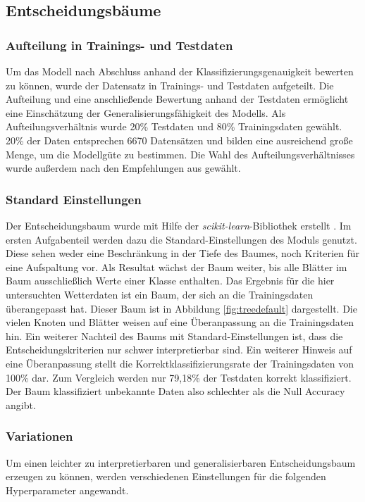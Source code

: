 \subsection{Entscheidungsbäume}
\label{section:Entscheidungsbäume}
\subsubsection{Aufteilung in Trainings- und Testdaten}
\label{section:train_test_split}
Um das Modell nach Abschluss anhand der Klassifizierungsgenauigkeit bewerten zu können, wurde der Datensatz in Trainings- und Testdaten aufgeteilt. Die Aufteilung und eine anschließende Bewertung anhand der Testdaten ermöglicht eine Einschätzung der Generalisierungsfähigkeit des Modells. Als Aufteilungsverhältnis wurde 20\% Testdaten und 80\% Trainingsdaten gewählt. 20\% der Daten entsprechen 6670 Datensätzen und bilden eine ausreichend große Menge, um die Modellgüte zu bestimmen. Die Wahl des Aufteilungsverhältnisses wurde außerdem nach den Empfehlungen aus \cite{geron2017hands-on} gewählt.

\subsubsection{Standard Einstellungen}
Der Entscheidungsbaum wurde mit Hilfe der \emph{scikit-learn}-Bibliothek erstellt \cite{scikit-learn}. Im ersten Aufgabenteil werden dazu die Standard-Einstellungen des Moduls genutzt. Diese sehen weder eine Beschränkung in der Tiefe des Baumes, noch Kriterien für eine Aufspaltung vor. Als Resultat wächst der Baum weiter, bis alle Blätter im Baum ausschließlich Werte einer Klasse enthalten. Das Ergebnis für die hier untersuchten Wetterdaten ist ein Baum, der sich an die Trainingsdaten überangepasst hat. Dieser Baum ist in Abbildung \ref{fig:treedefault} dargestellt. Die vielen Knoten und Blätter weisen auf eine Überanpassung an die Trainingsdaten hin. Ein weiterer Nachteil des Baums mit Standard-Einstellungen ist, dass die Entscheidungskriterien nur schwer interpretierbar sind. Ein weiterer Hinweis auf eine Überanpassung stellt die Korrektklassifizierungsrate der Trainingsdaten von 100\% dar. Zum Vergleich werden nur 79,18\% der Testdaten korrekt klassifiziert. Der Baum klassifiziert unbekannte Daten also schlechter als die Null Accuracy angibt.

\subsubsection{Variationen}
\label{variation_tree}
Um einen leichter zu interpretierbaren und generalisierbaren Entscheidungsbaum erzeugen zu können, werden verschiedenen Einstellungen für die folgenden Hyperparameter angewandt. 

